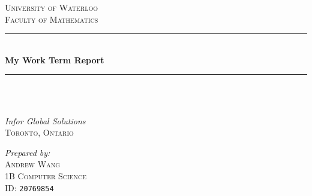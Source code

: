 \documentclass[12pt]{article}
\begin{document}
\begin{titlepage} %
	\newcommand{\HRule}{\rule{\linewidth}{0.5mm}} %

	\center %


	\textsc{\Large University of Waterloo}\\[0.4cm] %
	\textsc{\large Faculty of Mathematics}\\[1.5cm] %


	\HRule\\[0.4cm]

	{\huge\bfseries My Work Term Report}\\[0.4cm] %

	\HRule\\[2cm]



	~
	\begin{minipage}{0.4\textwidth}
		\begin{center}
			\large
			\textit{Infor Global Solutions}\\%
			\textsc{Toronto, Ontario}\\[0.5cm]
			\vspace{2cm}
		\end{center}
	\end{minipage}

	\begin{minipage}{0.4\textwidth}
		\begin{center}
			\large
			\textit{Prepared by:}\\
			\textsc{Andrew Wang}\\ %
			\normalsize
			\textsc{1B Computer Science}\\
			\textsc{ID: } \texttt{20769854}\\
		\end{center}
	\end{minipage}


\end{titlepage}
\end{document}
